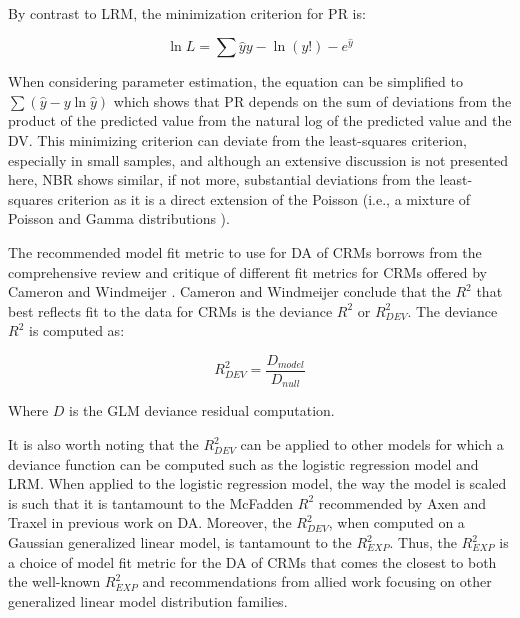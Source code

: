 \documentclass[ShortAfour,times,sageapa]{sagej}
\begin{document}
	By contrast to LRM, the minimization criterion for PR is:
	
		$$\ln L = \sum{\hat{y}y - \ln (y!) - e^{\hat{y}}}$$

	When considering parameter estimation, the equation can be simplified to $\sum (\hat{y} - y \ln \hat{y})$ \cite{cameron1996r} which shows that PR depends on the sum of deviations from the product of the predicted value from the natural log of the predicted value and the DV.
	This minimizing criterion can deviate from the least-squares criterion, especially in small samples, and 
	although an extensive discussion is not presented here, NBR shows similar, if not more, substantial deviations from the least-squares criterion as it is a direct extension of the Poisson (i.e., a mixture of Poisson and Gamma distributions \cite{blevins2015count}).
	
%	
	
	The recommended model fit metric to use for DA of CRMs borrows from the comprehensive review and critique of different fit metrics for CRMs offered by Cameron and Windmeijer \cite{cameron1996r}.
	Cameron and Windmeijer conclude that the $R^2$ that best reflects fit to the data for CRMs is the deviance $R^2$ or $R^{2}_{DEV}$.
	The deviance $R^2$ is computed as:
	
	$$R^{2}_{DEV} = \frac{D_{model}}{D_{null}}$$
	
	Where $D$ is the GLM deviance residual computation.
	
	It is also worth noting that the $R^2_{DEV}$ can be applied to other models for which a deviance function can be computed such as the logistic regression model and LRM.  
	When applied to the logistic regression model, the way the model is scaled is such that it is tantamount to the McFadden $R^2$ recommended by Axen and Traxel \cite{azen2009using} in previous work on DA.
	Moreover, the $R^2_{DEV}$, when computed on a Gaussian generalized linear model, is tantamount to the $R^2_{EXP}$.
	Thus, the $R^2_{EXP}$ is a choice of model fit metric for the DA of CRMs that comes the closest to both the well-known $R^2_{EXP}$ and recommendations from allied work focusing on other generalized linear model distribution families.
	
\end{document}
